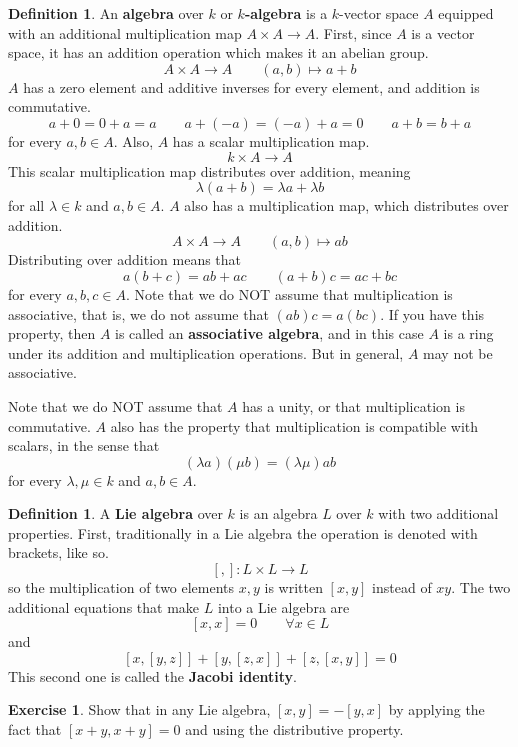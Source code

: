 \documentclass[12pt]{article}
\theoremstyle{definition}
\newtheorem{definition}[theorem]{Definition}
\newtheorem{exercise}[theorem]{Exercise}
\numberwithin{theorem}{subsection}
\newcommand{\lam}{\lambda}
\newcommand{\tbf}{\textbf}
\begin{document}
\begin{definition}
An \tbf{algebra} over $k$ or \tbf{$k$-algebra} is a $k$-vector space $A$ equipped with an additional multiplication map $A \times A \to A$. First, since $A$ is a vector space, it has an addition operation which makes it an abelian group. 
	\[
		A \times A \to A \qquad (a,b) \mapsto a+b
	\]
	$A$ has a zero element and additive inverses for every element, and addition is commutative.
	\[
		a + 0 = 0 + a = a \qquad a + (-a) = (-a) + a = 0 \qquad a+b = b+a
	\]
for every $a,b \in A$. Also, $A$ has a scalar multiplication map.
	\[
		k \times A \to A
	\]
	This scalar multiplication map distributes over addition, meaning
	\[
		\lam(a+b) = \lam a + \lam b
	\]
for all $\lam \in k$ and $a,b \in A$. $A$ also has a multiplication map, which distributes over addition.
	\[
		A \times A \to A \qquad (a,b) \mapsto ab
	\]
	Distributing over addition means that
	\[
		a(b+c) = ab + ac \qquad (a+b)c = ac + bc
	\]
for every $a,b,c \in A$. Note that we do NOT assume that multiplication is associative, that is, we do not assume that $(ab)c = a(bc)$. If you have this property, then $A$ is called an \tbf{associative algebra}, and in this case $A$ is a ring under its addition and multiplication operations. But in general, $A$ may not be associative.

Note that we do NOT assume that $A$ has a unity, or that multiplication is commutative. $A$ also has the property that multiplication is compatible with scalars, in the sense that
	\[
		(\lam a)(\mu b) = (\lam \mu) ab
	\]
	for every $\lam, \mu \in k$ and $a,b \in A$.
\end{definition}

\begin{definition}
A \tbf{Lie algebra} over $k$ is an algebra $L$ over $k$ with two additional properties. First, traditionally in a Lie algebra the operation is denoted with brackets, like so.
\[
	[,]:L \times L \to L
\]
so the multiplication of two elements $x,y$ is written $[x,y]$ instead of $xy$. The two additional equations that make $L$ into a Lie algebra are
\[
	[x,x] = 0 \qquad \forall x \in L
\]
and
\[
	[x,[y,z]] + [y,[z,x]] + [z,[x,y]] = 0
\]
This second one is called the \tbf{Jacobi identity}.
\end{definition}

\begin{exercise}
Show that in any Lie algebra, $[x,y] = -[y,x]$ by applying the fact that $[x+y,x+y]=0$ and using the distributive property.
\end{exercise}
\end{document}
